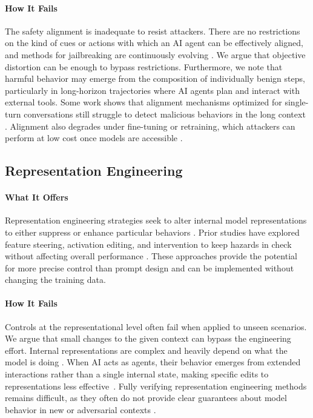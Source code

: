 \documentclass{article}
\theoremstyle{plain}
\theoremstyle{definition}
\theoremstyle{remark}
\begin{document}
\paragraph{How It Fails}
The safety alignment is inadequate to resist attackers. There are no restrictions on the kind of cues or actions with which an AI agent can be effectively aligned, and methods for jailbreaking are continuously evolving \citep{andriushchenko2025jailbreaking}. We argue that objective distortion can be enough to bypass restrictions. Furthermore, we note that harmful behavior may emerge from the composition of individually benign steps, particularly in long-horizon trajectories where AI agents plan and interact with external tools. Some work shows that alignment mechanisms optimized for single-turn conversations still struggle to detect malicious behaviors in the long context \citep{lynch2025agentic}. Alignment also degrades under fine-tuning or retraining, which attackers can perform at low cost once models are accessible \citep{qi2024finetuning}.

\subsection{Representation Engineering}

\paragraph{What It Offers}
Representation engineering strategies seek to alter internal model representations to either suppress or enhance particular behaviors \citep{mitchell2022fast}. Prior studies have explored feature steering, activation editing, and intervention to keep hazards in check without affecting overall performance \citep{zou2023representation, ghandeharioun2024s, wang2025model}. These approaches provide the potential for more precise control than prompt design and can be implemented without changing the training data.

\paragraph{How It Fails}
Controls at the representational level often fail when applied to unseen scenarios. We argue that small changes to the given context can bypass the engineering effort. Internal representations are complex and heavily depend on what the model is doing \citep{tan2024analysing,zhang2024adversarial}.
When AI acts as agents, their behavior emerges from extended interactions rather than a single internal state, making specific edits to representations less effective~\citep{wehner2025taxonomy}.  Fully verifying representation engineering methods remains difficult, as they often do not provide clear guarantees about model behavior in new or adversarial contexts \citep{tan2024analysing}.
\end{document}
